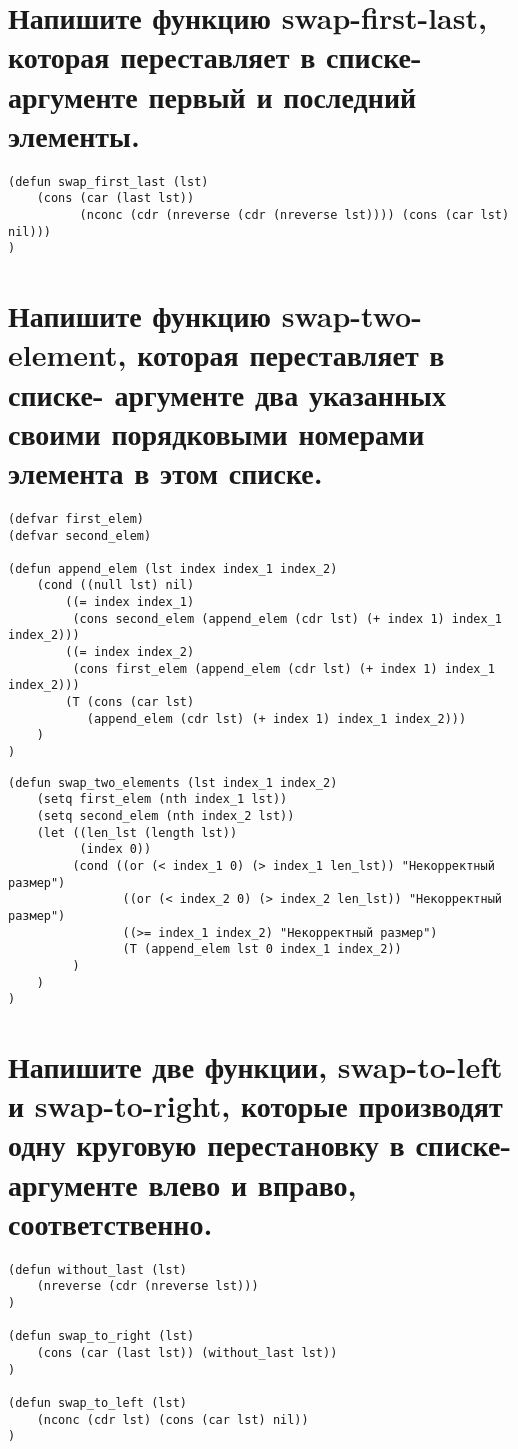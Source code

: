 \section{Напишите функцию swap-first-last, которая переставляет в списке-аргументе первый и последний элементы.}
\begin{lstlisting}[basicstyle=\footnotesize, caption=Задание 4]
(defun swap_first_last (lst)
	(cons (car (last lst)) 
	      (nconc (cdr (nreverse (cdr (nreverse lst)))) (cons (car lst) nil)))
)
\end{lstlisting}

\section{Напишите функцию swap-two-element, которая переставляет в списке- аргументе два указанных своими порядковыми номерами элемента в этом списке.}
\begin{lstlisting}[basicstyle=\footnotesize, caption=Задание 5]
(defvar first_elem)
(defvar second_elem)

(defun append_elem (lst index index_1 index_2)
	(cond ((null lst) nil)
		((= index index_1) 
		 (cons second_elem (append_elem (cdr lst) (+ index 1) index_1 index_2)))
		((= index index_2) 
		 (cons first_elem (append_elem (cdr lst) (+ index 1) index_1 index_2)))
		(T (cons (car lst) 
		   (append_elem (cdr lst) (+ index 1) index_1 index_2)))
	)
)
\end{lstlisting}
\newpage
\begin{lstlisting}[basicstyle=\footnotesize, caption=Задание 5 (продолжение)]
(defun swap_two_elements (lst index_1 index_2)
	(setq first_elem (nth index_1 lst))
	(setq second_elem (nth index_2 lst))
	(let ((len_lst (length lst))
		  (index 0))
		 (cond ((or (< index_1 0) (> index_1 len_lst)) "Некорректный размер")
	            ((or (< index_2 0) (> index_2 len_lst)) "Некорректный размер")
	            ((>= index_1 index_2) "Некорректный размер")
	            (T (append_elem lst 0 index_1 index_2))
	     )
	)
)
\end{lstlisting}

\section{Напишите две функции, swap-to-left и swap-to-right, которые производят одну круговую перестановку в списке-аргументе влево и вправо, соответственно.}
\begin{lstlisting}[basicstyle=\footnotesize, caption=Задание 6]
(defun without_last (lst)
	(nreverse (cdr (nreverse lst)))
)

(defun swap_to_right (lst)
	(cons (car (last lst)) (without_last lst))
)

(defun swap_to_left (lst)
	(nconc (cdr lst) (cons (car lst) nil))
)
\end{lstlisting}


